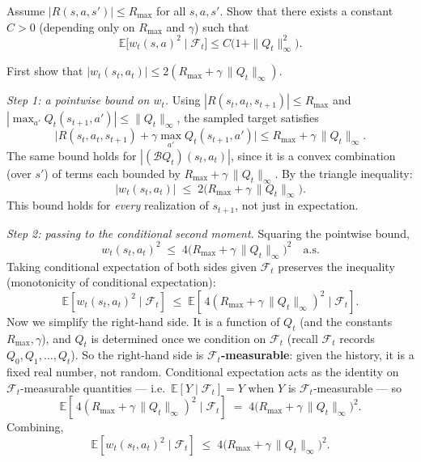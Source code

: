 \documentclass[11pt]{article}
\begin{document}
\begin{exercise}
\label{prob:noise_bounded_var} Assume $|R(s,a,s')| \le R_{\max}$ for all $s, a, s'$. Show that there exists a constant $C > 0$ (depending only on $R_{\max}$ and $\gamma$) such that
$$
\mathbb{E}\bigl[w_t(s,a)^2 \mid \mathcal{F}_t\bigr] \le C\bigl(1 + \|Q_t\|_\infty^2\bigr).
$$
\begin{hint}
First show that $|w_t(s_t, a_t)| \le 2(R_{\max} + \gamma\, \|Q_t\|_\infty)$.
\end{hint}
\end{exercise}

\begin{solution}
\emph{Step 1: a pointwise bound on $w_t$.} Using $|R(s_t, a_t, s_{t+1})| \le R_{\max}$ and $|\max_{a'} Q_t(s_{t+1}, a')| \le \|Q_t\|_\infty$, the sampled target satisfies
$$
\bigl|R(s_t, a_t, s_{t+1}) + \gamma \max_{a'} Q_t(s_{t+1}, a')\bigr| \le R_{\max} + \gamma\,\|Q_t\|_\infty.
$$
The same bound holds for $|(\mathcal{B}Q_t)(s_t, a_t)|$, since it is a convex combination (over $s'$) of terms each bounded by $R_{\max} + \gamma\,\|Q_t\|_\infty$. By the triangle inequality:
$$
|w_t(s_t, a_t)| \;\le\; 2\bigl(R_{\max} + \gamma\,\|Q_t\|_\infty\bigr).
$$
This bound holds for \emph{every} realization of $s_{t+1}$, not just in expectation.

\emph{Step 2: passing to the conditional second moment.} Squaring the pointwise bound,
$$
w_t(s_t, a_t)^2 \;\le\; 4\bigl(R_{\max} + \gamma\,\|Q_t\|_\infty\bigr)^2 \quad \text{a.s.}
$$
Taking conditional expectation of both sides given $\mathcal{F}_t$ preserves the inequality (monotonicity of conditional expectation):
$$
\mathbb{E}\!\left[w_t(s_t, a_t)^2 \mid \mathcal{F}_t\right]
\;\le\; \mathbb{E}\!\left[\,4(R_{\max} + \gamma\,\|Q_t\|_\infty)^2 \mid \mathcal{F}_t\right].
$$
Now we simplify the right-hand side. It is a function of $Q_t$ (and the constants $R_{\max}, \gamma$), and $Q_t$ is determined once we condition on $\mathcal{F}_t$ (recall $\mathcal{F}_t$ records $Q_0, Q_1, \ldots, Q_t$). So the right-hand side is \textbf{$\mathcal{F}_t$-measurable}: given the history, it is a fixed real number, not random. Conditional expectation acts as the identity on $\mathcal{F}_t$-measurable quantities --- i.e.\ $\mathbb{E}[Y \mid \mathcal{F}_t] = Y$ when $Y$ is $\mathcal{F}_t$-measurable --- so
$$
\mathbb{E}\!\left[\,4(R_{\max} + \gamma\,\|Q_t\|_\infty)^2 \mid \mathcal{F}_t\right]
\;=\; 4\bigl(R_{\max} + \gamma\,\|Q_t\|_\infty\bigr)^2.
$$
Combining,
$$
\mathbb{E}\!\left[w_t(s_t, a_t)^2 \mid \mathcal{F}_t\right]
\;\le\; 4\bigl(R_{\max} + \gamma\,\|Q_t\|_\infty\bigr)^2.
$$


\end{solution}
\end{document}
